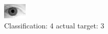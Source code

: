 \begin{figure}[h!]
\begin{center}
\includegraphics[width=0.60\columnwidth]{figures/ID2153_class_4_target_3.png}
\end{center}
\caption{ Classification: 4 actual target: 3}
\label{fig:ID2153_class_4_target_3}
\end{figure}
